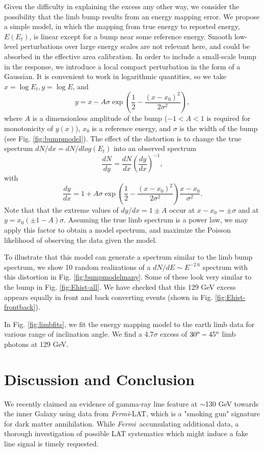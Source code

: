 \documentclass[aps,twocolumn,prd,superscriptaddress,showpacs,nofootinbib,fixfloat]{revtex4}
\newcommand{\be}{\begin{equation}}
\newcommand{\ee}{\end{equation}}
\newcommand{\Fermi}{{\slshape Fermi}}
\newcommand{\degree}{^{\rm o}}
\begin{document}
Given the difficulty in explaining the excess any other way,
we consider the possibility that the limb bump results from
an energy mapping error.  We propose a simple model, in
which the mapping from true energy to reported energy,
$E(E_t)$, is linear except for a bump near some reference
energy.  Smooth low-level perturbations over large energy
scales are not relevant here, and could be absorbed in the
effective area calibration.  In order to include a
small-scale bump in the response, we introduce a local
compact perturbation in the form of a Gaussian.  It is
convenient to work in logarithmic quantities, so we take
$x=\log E_t, y=\log E$, and \be
\label{eq:yofx}
y=x - A\sigma \exp\left(\frac{1}{2}-\frac{(x-x_0)^2}{2\sigma^2}\right),
\ee
where $A$ is a dimensionless amplitude of the bump ($-1<A<1$ is required
for monotonicity of $y(x)$), $x_0$ is a reference energy, and $\sigma$ is the
width of the bump (see Fig. \ref{fig:bumpmodel}).
The effect of the distortion is to change the true spectrum $dN/dx =
dN/dlog(E_t)$ into an observed spectrum
\be
\label{eq:dndy}
\frac{dN}{dy} = \frac{dN}{dx} \left(\frac{dy}{dx}\right)^{-1} ,
\ee
with
\be
\label{eq:dydx}
\frac{dy}{dx} = 1 + A\sigma \exp\left(\frac{1}{2}-\frac{(x-x_0)^2}{2\sigma^2}\right)
\frac{x-x_0}{\sigma^2}.
\ee
Note that that the extreme values of $dy/dx = 1 \pm A$ occur at $x-x_0 = \pm
\sigma$ and at $y=x_0(\pm1-A)\sigma$.  Assuming the true limb spectrum is a
power law, we may apply this factor to obtain a model spectrum, and maximize
the Poisson likelihood of observing the data given the model.

To illustrate that this model can generate a spectrum
similar to the limb bump spectrum, we show 10 random
realizations of a $dN/dE \sim E^{-2.6}$ spectrum with this
distortion in Fig. \ref{fig:bumpmodelmany}.  Some of these
look very similar to the bump in
Fig. \ref{fig:Ehist-all}. We have checked that this 129 GeV
excess appears equally in front and back converting events
(shown in Fig. \ref{fig:Ehist-frontback}).

In Fig. \ref{fig:limbfits}, we fit the energy mapping model
to the earth limb data for various range of inclination
angle. We find a 4.7$\sigma$ excess of $30\degree-45\degree$
limb photons at 129 GeV.


\section{Discussion and Conclusion}

We recently claimed an evidence of gamma-ray line feature at
$\sim$130 GeV towards the inner Galaxy using data from
\Fermi-LAT, which is a "smoking gun" signature for dark
matter annihilation. While \Fermi\ accumulating additional
data, a thorough investigation of possible LAT systematics
which might induce a fake line signal is timely requested.
\end{document}
